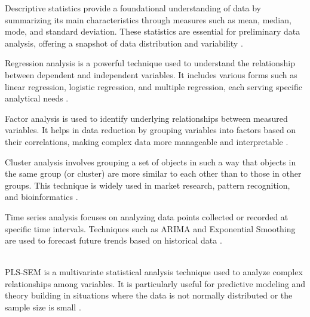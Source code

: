 \begin{description}[font=\normalfont\itshape]
    \item[\textit{\textbf{Descriptive Statistics}}] Descriptive statistics provide a foundational understanding of data by summarizing its main characteristics through measures such as mean, median, mode, and standard deviation. These statistics are essential for preliminary data analysis, offering a snapshot of data distribution and variability \parencite{Mann2018IntroductoryStatistics}.

    \item[\textit{\textbf{Regression Analysis}}] Regression analysis is a powerful technique used to understand the relationship between dependent and independent variables. It includes various forms such as linear regression, logistic regression, and multiple regression, each serving specific analytical needs \parencite{Montgomery2021IntroductionAnalysis}.

    \item[\textit{\textbf{Factor Analysis}}] Factor analysis is used to identify underlying relationships between measured variables. It helps in data reduction by grouping variables into factors based on their correlations, making complex data more manageable and interpretable \parencite{Andy2018DiscoveringStatistics}.

    \item[\textit{\textbf{Cluster Analysis}}] Cluster analysis involves grouping a set of objects in such a way that objects in the same group (or cluster) are more similar to each other than to those in other groups. This technique is widely used in market research, pattern recognition, and bioinformatics \parencite{Hair2019WhenPLS-SEM}.

    \item[\textit{\textbf{Time Series Analysis}}] Time series analysis focuses on analyzing data points collected or recorded at specific time intervals. Techniques such as ARIMA and Exponential Smoothing are used to forecast future trends based on historical data \parencite{Box2015TimeControl}.

    \item[\textit{\textbf{Partial Least Squares Structural Equation Modeling (PLS-SEM)}}] \hfill \\
    PLS-SEM is a multivariate statistical analysis technique used to analyze complex relationships among variables. It is particularly useful for predictive modeling and theory building in situations where the data is not normally distributed or the sample size is small \parencite{Sarstedt2017PartialModeling}.
\end{description}

